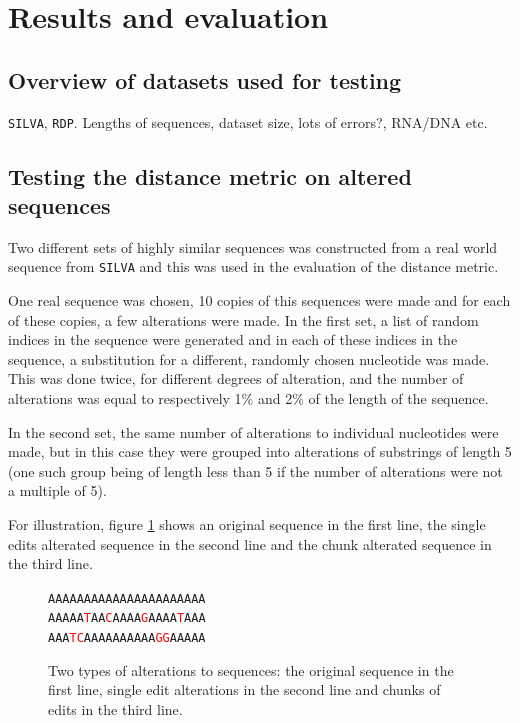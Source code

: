 \section{Results and evaluation} \label{sec:results}

\subsection{Overview of datasets used for testing}

\texttt{SILVA}, \texttt{RDP}. Lengths of sequences, dataset size, lots of
errors?, RNA/DNA etc.


\subsection{Testing the distance metric on altered sequences}
\label{sec:altered_sequences}

Two different sets of highly similar sequences was constructed from a real
world sequence from \texttt{SILVA} and this was used in the evaluation of the
distance metric.

One real sequence was chosen, 10 copies of this sequences were made and for
each of these copies, a few alterations were made. In the first set, a list of
random indices in the sequence were generated and in each of these indices in
the sequence, a substitution for a different, randomly chosen nucleotide was
made. This was done twice, for different degrees of alteration, and the number
of alterations was equal to respectively 1\% and 2\% of the length of the
sequence.

In the second set, the same number of alterations to individual nucleotides
were made, but in this case they were grouped into alterations of substrings of
length 5 (one such group being of length less than 5 if the number of
alterations were not a multiple of 5).

For illustration, figure \ref{fig:alterations} shows an original sequence in
the first line, the single edits alterated sequence in the second line and the
chunk alterated sequence in the third line.

\newcommand{\tc}[1]{\textcolor{red}{#1}}
\begin{figure}[H]
  \centering
  \texttt{AAAAAAAAAAAAAAAAAAAAAA} \\
  \texttt{AAAAA\tc{T}AA\tc{C}AAAA\tc{G}AAAA\tc{T}AAA} \\
  \texttt{AAA\tc{TC}AAAAAAAAAA\tc{GG}AAAAA}
  \caption{Two types of alterations to sequences: the original sequence in the
    first line, single edit alterations in the second line and chunks of edits
    in the third line.}
  \label{fig:alterations}
\end{figure}

